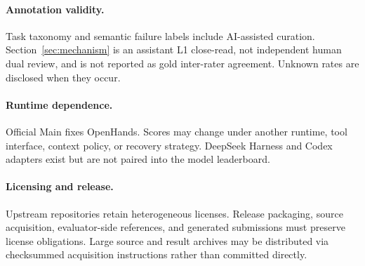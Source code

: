 \paragraph{Annotation validity.}
Task taxonomy and semantic failure labels include AI-assisted curation.
Section~\ref{sec:mechanism} is an assistant L1 close-read, not independent
human dual review, and is not reported as gold inter-rater agreement.
Unknown rates are disclosed when they occur.

\paragraph{Runtime dependence.}
Official Main fixes OpenHands. Scores may change under another runtime, tool
interface, context policy, or recovery strategy. DeepSeek Harness and Codex
adapters exist but are not paired into the model leaderboard.

\paragraph{Licensing and release.}
Upstream repositories retain heterogeneous licenses. Release packaging, source
acquisition, evaluator-side references, and generated submissions must preserve
license obligations. Large source and result archives may be distributed via
checksummed acquisition instructions rather than committed directly.
